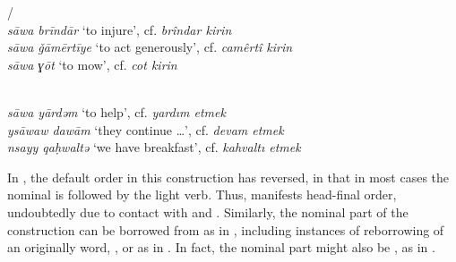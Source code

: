 \documentclass[output=paper]{langsci/langscibook}
\begin{document}
\begin{exe}
\ex \label{light}
		\begin{xlist}
		\ex {}/  \citep[184]{Talay2007}\\ \textit{s\={a}wa brīndār} `to injure',	cf.  \textit{brîndar kirin}\\
\textit{s\={a}wa \v{g}āmērtīye} `to act generously', cf.  \textit{camêrtî kirin}\\
\textit{s\={a}wa ɣōt} `to mow', cf.   \textit{cot kirin}


	\ex \label{com3}   \citep[202]{Lahdo2009}\\ \textit{s\={a}wa yārdəm} `to help', cf.  \textit{yardım etmek}\\
\textit{ys\={a}waw dawām} `they continue …', cf.   \textit{devam etmek}\\
\textit{nsayy qa\d{h}waltə} `we have breakfast', cf.  \textit{kahvalt{\i} etmek}
		\end{xlist}

\end{exe}



\noindent In  , the default order in this construction has reversed, in that in most cases the nominal is followed by the {light verb}. Thus,  manifests head-final order, undoubtedly due to contact with  and . Similarly, the nominal part of the construction can be borrowed from  as in , including instances of reborrowing of an originally  word, , or  as in . In fact, the nominal part might also be , as in .
\end{document}
